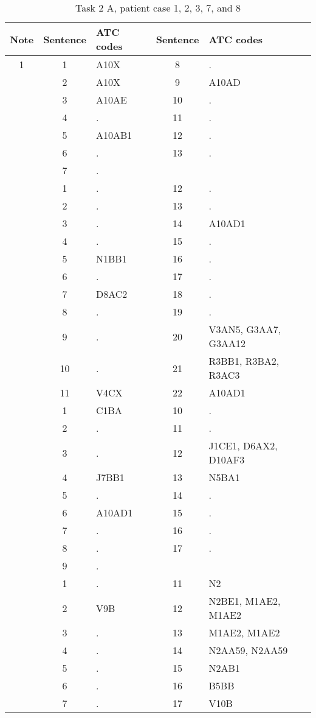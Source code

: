 \begin{table}[htbp] \footnotesize \center
\caption{Task 2 A, patient case 1, 2, 3, 7, and 8\label{tab:task2a}}
\begin{tabular}{c c l c l}
    \toprule
    Note & Sentence & ATC codes & Sentence & ATC codes \\
    \midrule
	1 & 1 & A10X & 8 & . \\
	 & 2 & A10X & 9 & A10AD \\
	 & 3 & A10AE & 10 & . \\
	 & 4 & . & 11 & . \\
	 & 5 & A10AB1 & 12 & . \\
	 & 6 & . & 13 & . \\
	 & 7 & . & & \\
	\addlinespace
	2 & 1 & . & 12 & . \\
	 & 2 & . & 13 & . \\
	 & 3 & . & 14 & A10AD1 \\
	 & 4 & . & 15 & . \\
	 & 5 & N1BB1 & 16 & . \\
	 & 6 & . & 17 & . \\
	 & 7 & D8AC2 & 18 & . \\
	 & 8 & . & 19 & . \\
	 & 9 & . & 20 & V3AN5, G3AA7, G3AA12 \\
	 & 10 & . & 21 & R3BB1, R3BA2, R3AC3 \\
	 & 11 & V4CX & 22 & A10AD1 \\
	\addlinespace
	3 & 1 & C1BA & 10 & . \\
	 & 2 & . & 11 & . \\
	 & 3 & . & 12 & J1CE1, D6AX2, D10AF3 \\
	 & 4 & J7BB1 & 13 & N5BA1 \\
	 & 5 & . & 14 & . \\
	 & 6 & A10AD1 & 15 & . \\
	 & 7 & . & 16 & . \\
	 & 8 & . & 17 & . \\
	 & 9 & . & & \\
	\addlinespace
	7 & 1 & . & 11 & N2 \\
	 & 2 & V9B & 12 & N2BE1, M1AE2, M1AE2 \\
	 & 3 & . & 13 & M1AE2, M1AE2 \\
	 & 4 & . & 14 & N2AA59, N2AA59 \\
	 & 5 & . & 15 & N2AB1 \\
	 & 6 & . & 16 & B5BB \\
	 & 7 & . & 17 & V10B \\

\end{tabular}
\end{table}
